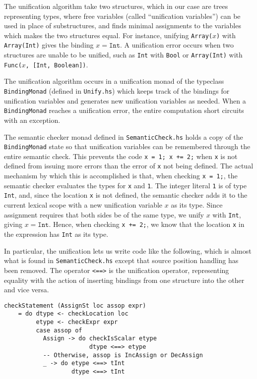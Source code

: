 \documentclass[11pt]{article}
\begin{document}
The unification algorithm take two structures, which in our case are
trees representing types, where free variables (called ``unification
variables'') can be used in place of substructures, and finds minimal
assignments to the variables which makes the two structures equal.
For instance, unifying \texttt{Array($x$)} with \texttt{Array(Int)}
gives the binding $x=\mathtt{Int}$.  A unification error occurs when
two structures are unable to be unified, such as \texttt{Int} with
\texttt{Bool} or \texttt{Array(Int)} with \texttt{Func($x$, [Int,
  Boolean])}.

The unification algorithm occurs in a unification monad of the
typeclass \texttt{BindingMonad} (defined in \texttt{Unify.hs}) which
keeps track of the bindings for unification variables and generates
new unification variables as needed.  When a \texttt{BindingMonad}
reaches a unification error, the entire computation short circuits
with an exception.

The semantic checker monad defined in \texttt{SemanticCheck.hs} holds
a copy of the \texttt{BindingMonad} state so that unification
variables can be remembered through the entire semantic check.  This
prevents the code \texttt{x = 1; x += 2;} when \texttt{x} is not
defined from issuing more errors than the error of \texttt{x} not
being defined.  The actual mechanism by which this is accomplished is
that, when checking \texttt{x = 1;}, the semantic checker evaluates
the types for \texttt{x} and \texttt{1}.  The integer literal
\texttt{1} is of type \texttt{Int}, and, since the location \texttt{x}
is not defined, the semantic checker adds it to the current lexical
scope with a new unification variable $x$ as its type.  Since
assignment requires that both sides be of the same type, we unify $x$
with \texttt{Int}, giving $x=\mathtt{Int}$.  Hence, when checking
\texttt{x += 2;}, we know that the location \texttt{x} in the
expression has \texttt{Int} as its type.

In particular, the unification lets us write code like the following,
which is almost what is found in \texttt{SemanticCheck.hs} except that
source position handling has been removed.  The operator \texttt{<==>}
is the unification operator, representing equality with the action of
inserting bindings from one structure into the other and vice versa.

\begin{verbatim}
checkStatement (AssignSt loc assop expr)
    = do dtype <- checkLocation loc
         etype <- checkExpr expr
         case assop of
           Assign -> do checkIsScalar etype
                        dtype <==> etype
           -- Otherwise, assop is IncAssign or DecAssign
           _ -> do etype <==> tInt
                   dtype <==> tInt
\end{verbatim}
\end{document}
